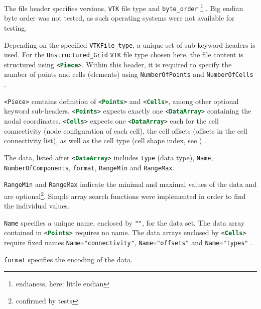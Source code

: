\bigbreak
The file header specifies versions, \texttt{VTK} file type and \lstinline[language=XML]{byte_order} \footnote{endianess, here: little endian} \cite{Kit}. Big endian byte order was not tested, as such operating systems were not available for testing.

\bigbreak
Depending on the specified \lstinline[language=XML]{VTKFile type}, a unique set of sub-keyword headers is used. For the \lstinline[language=XML]{Unstructured_Grid} \texttt{VTK} file type chosen here, the file content is structured using \lstinline[language=XML]{<Piece>}. Within this header, it is required to specify the number of points and cells (elements) using \lstinline[language=XML]{NumberOfPoints} and \lstinline[language=XML]{NumberOfCells} \cite{Kit}.

\bigbreak
\lstinline{<Piece>} contains definition of \lstinline[language=XML]{<Points>} and \lstinline[language=XML]{<Cells>}, among other optional keyword sub-headers. \lstinline[language=XML]{<Points>} expects exactly one \lstinline[language=XML]{<DataArray>} containing the nodal coordinates. \lstinline[language=XML]{<Cells>} expects one \lstinline[language=XML]{<DataArray>} each for the cell connectivity (node configuration of each cell), the cell offsets (offsets in the cell connectivity list), as well as the cell type (cell shape index, see \cite{Kit}) \cite{Bun09}.

\bigbreak
The data, listed after \lstinline[language=XML]{<DataArray>} includes \lstinline[language=XML]{type} (data type), \lstinline[language=XML]{Name}, \lstinline[language=XML]{NumberOfComponents}, \lstinline[language=XML]{format}, \lstinline[language=XML]{RangeMin} and \lstinline[language=XML]{RangeMax}.

\bigbreak
\lstinline[language=XML]{RangeMin} and \lstinline[language=XML]{RangeMax} indicate the minimal and maximal values of the data and are optional\footnote{confirmed by tests}. Simple array search functions were implemented in order to find the individual values.

\bigbreak
\lstinline{Name} specifies a unique name, enclosed by \texttt{""}, for the data set. The data array contained in \lstinline[language=XML]{<Points>} requires no name. The data arrays enclosed by \lstinline[language=XML]{<Cells>} require fixed names \lstinline[language=XML]{Name="connectivity"}, \lstinline[language=XML]{Name="offsets"} and \lstinline[language=XML]{Name="types"} \cite{Kit}.  

\bigbreak
\lstinline[language=XML]{format} specifies the encoding of the data.

